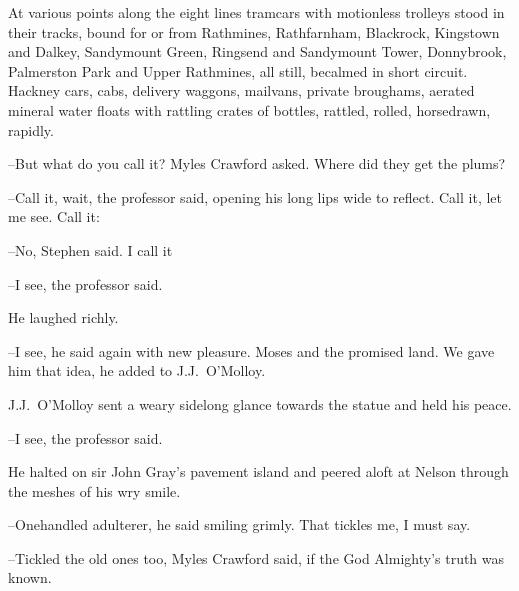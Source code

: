 
At various points along the eight lines
tramcars with motionless trolleys stood in their tracks,
bound for or from
Rathmines,
Rathfarnham,
Blackrock,
Kingstown and Dalkey,
Sandymount Green,
Ringsend and
Sandymount Tower,
Donnybrook,
Palmerston Park and Upper Rathmines,
all still,
becalmed in short circuit.
Hackney cars,
cabs,
delivery
waggons,
mailvans,
private broughams,
aerated mineral water floats with rattling crates of bottles,
rattled,
rolled,
horsedrawn,
rapidly.




--But what do you call it?
Myles Crawford asked.
Where did they get the plums?



--Call it, wait,
the professor said,
opening his long lips wide to
reflect.
Call it,
let me see.
Call it:

--No,
Stephen said.
I call it

--I see,
the professor said.

He laughed richly.

--I see,
he said again with new pleasure.
Moses and the promised land.
We gave him that idea,
he added to J.J.~O'Molloy.



J.J.~O'Molloy sent a weary sidelong glance towards the statue
and held his peace.

--I see,
the professor said.

He halted on sir John Gray's pavement island
and peered aloft at Nelson through the meshes of his wry smile.



--Onehandled adulterer,
he said smiling grimly.
That tickles me, I must say.

--Tickled the old ones too,
Myles Crawford said,
if the God Almighty's truth was known.


